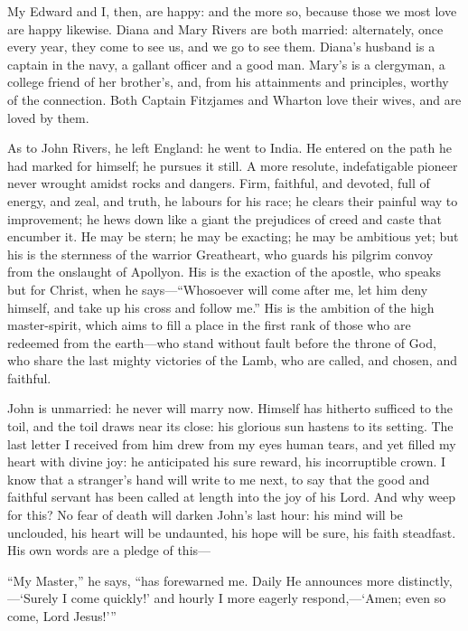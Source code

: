 My Edward and I, then, are happy: and the more so, because those we most
love are happy likewise. Diana and Mary Rivers are both married:
alternately, once every year, they come to see us, and we go to see
them. Diana's husband is a captain in the navy, a gallant officer and a
good man. Mary's is a clergyman, a college friend of her brother's,
and, from his attainments and principles, worthy of the connection.
Both Captain Fitzjames and \Mr{} Wharton love their wives, and are loved
by them.

As to \St{} John Rivers, he left England: he went to India. He entered on
the path he had marked for himself; he pursues it still. A more
resolute, indefatigable pioneer never wrought amidst rocks and dangers.
Firm, faithful, and devoted, full of energy, and zeal, and truth, he
labours for his race; he clears their painful way to improvement; he
hews down like a giant the prejudices of creed and caste that encumber
it. He may be stern; he may be exacting; he may be ambitious yet; but
his is the sternness of the warrior Greatheart, who guards his pilgrim
convoy from the onslaught of Apollyon. His is the exaction of the
apostle, who speaks but for Christ, when he says---\enquote{Whosoever
	will come after me, let him deny himself, and take up his cross and
	follow me.} His is the ambition of the high master-spirit, which aims
to fill a place in the first rank of those who are redeemed from the
earth---who stand without fault before the throne of God, who share the
last mighty victories of the Lamb, who are called, and chosen, and
faithful.

\St{} John is unmarried: he never will marry now. Himself has hitherto
sufficed to the toil, and the toil draws near its close: his glorious
sun hastens to its setting. The last letter I received from him drew
from my eyes human tears, and yet filled my heart with divine joy: he
anticipated his sure reward, his incorruptible crown. I know that a
stranger's hand will write to me next, to say that the good and faithful
servant has been called at length into the joy of his Lord. And why
weep for this? No fear of death will darken \St{} John's last hour: his
mind will be unclouded, his heart will be undaunted, his hope will be
sure, his faith steadfast. His own words are a pledge of this---

\enquote{My Master,} he says, \enquote{has forewarned me. Daily He
	announces more distinctly,---\enquote{Surely I come quickly!} and hourly I more
	eagerly respond,---\enquote{Amen; even so come, Lord Jesus!}}
